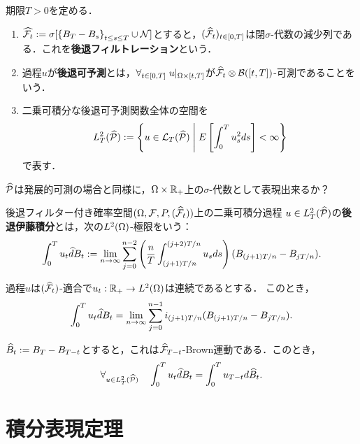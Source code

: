 \documentclass[uplatex,dvipdfmx]{jsreport}
\begin{document}
\begin{definition}
    期限$T>0$を定める．
    \begin{enumerate}
        \item $\widehat{\mathcal{F}_t}:=\sigma[\left\{B_T-B_s\right\}_{t\le s\le T}\cup\mathcal{N}]$とすると，$(\widehat{\mathcal{F}}_t)_{t\in[0,T]}$は閉$\sigma$-代数の減少列である．これを\textbf{後退フィルトレーション}という．
        \item 過程$u$が\textbf{後退可予測}とは，$\forall_{t\in[0,T]}\;u|_{\Omega\times[t,T]}$が$\widehat{\mathcal{F}}_t\otimes\mathcal{B}([t,T])$-可測であることをいう．
        \item 二乗可積分な後退可予測関数全体の空間を
        \[L^2_T(\widehat{\mathcal{P}}):=\left\{u\in\mathcal{L}_T(\widehat{\mathcal{P}})\;\middle|\;E\left[\int^T_0u_s^2ds\right]<\infty\right\}\]
        で表す．
    \end{enumerate}
\end{definition}
\begin{remarks}
    $\widehat{\mathcal{P}}$は発展的可測の場合と同様に，$\Omega\times\mathbb{R}_+$上の$\sigma$-代数として表現出来るか？
\end{remarks}

\begin{definition}
    後退フィルター付き確率空間$(\Omega,\mathcal{F},P,(\widehat{\mathcal{F}}_t))$上の二乗可積分過程
    $u\in L^2_T(\widehat{\mathcal{P}})$の\textbf{後退伊藤積分}とは，次の$L^2(\Omega)$-極限をいう：
    \[\int^T_0u_t\widehat{d}B_t:=\lim_{n\to\infty}\sum^{n-2}_{j=0}\left(\frac{n}{T}\int^{(j+2)T/n}_{(j+1)T/n}u_sds\right)(B_{(j+1)T/n}-B_{jT/n}).\]
\end{definition}

\begin{proposition}[後退Riemann和の極限としての特徴付け]
    過程$u$は$(\widehat{\mathcal{F}}_t)$-適合で$u_t:\mathbb{R}_+\to L^2(\Omega)$は連続であるとする．
    このとき，
    \[\int^T_0u_t\widehat{d}B_t=\lim_{n\to\infty}\sum^{n-1}_{j=0}i_{(j+1)T/n}(B_{(j+1)T/n}-B_{jT/n}).\]
\end{proposition}

\begin{proposition}[伊藤積分への帰着]
    $\widehat{B}_t:=B_T-B_{T-t}$とすると，これは$\widehat{\mathcal{F}}_{T-t}$-Brown運動である．このとき，
    \[\forall_{u\in L^2_T(\widehat{\mathcal{P}})}\quad\int^T_0u_t\widehat{d}B_t=\int^T_0u_{T-t}d\widehat{B}_t.\]
\end{proposition}

\section{積分表現定理}
\end{document}
